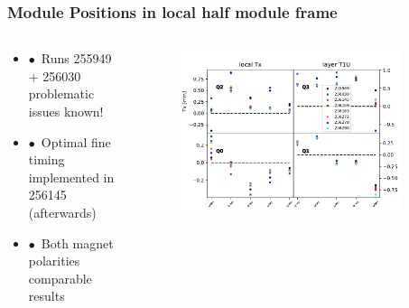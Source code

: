 \documentclass[xcolor=dvipsnames, aspectratio=1610, 12pt]{beamer}
\begin{document}
\begin{frame}\frametitle{Module Positions in local half module frame}
  \begin{columns}
    \begin{column}[c]{0.35\textwidth}
      \begin{itemize}
        \setlength\itemsep{0em}
        \item $\bullet$\, Runs 255949 + 256030 problematic \to issues known!
        \item $\bullet$\, Optimal fine timing implemented in 256145 (afterwards)
        \item $\bullet$\, Both magnet polarities comparable results
      \end{itemize}
    \end{column}
    \begin{column}[c]{0.65\textwidth}
      \begin{figure}
        \includegraphics[width=0.9\textwidth]{plots/raw_data_T1U_Tx.pdf}
      \end{figure}
    \end{column}
  \end{columns}
\end{frame}
\end{document}
